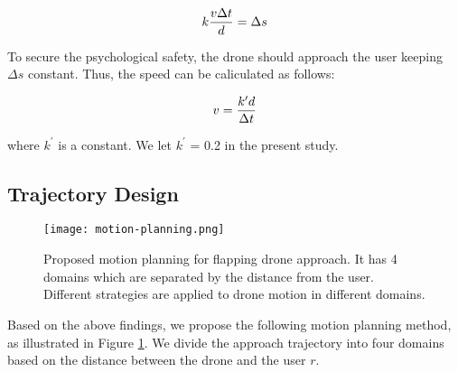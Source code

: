 \begin{equation}
    k{v\Delta t\over d}=\Delta s
\end{equation}

To secure the psychological safety, the drone should approach the user keeping $\Delta s$ constant.
Thus, the speed can be caliculated as follows:

\begin{equation}
    v = {k^\prime d\over \Delta t}
    \label{eq:speed}
\end{equation}

where $k^\prime$ is a constant.
We let $k^\prime$ = 0.2 in the present study.

\subsection{Trajectory Design}
\label{sec:trajectory}

\begin{figure}[t]
    \centering
    \texttt{[image: motion-planning.png]}
    \caption{Proposed motion planning for flapping drone approach. It has 4 domains which are separated by the distance from the user. Different strategies are applied to drone motion in different domains.
    }
    \label{fig:trajectory}
\end{figure}

Based on the above findings, we propose the following motion planning method, as illustrated in Figure \ref{fig:trajectory}.
We divide the approach trajectory into four domains based on the distance between the drone and the user $r$.

